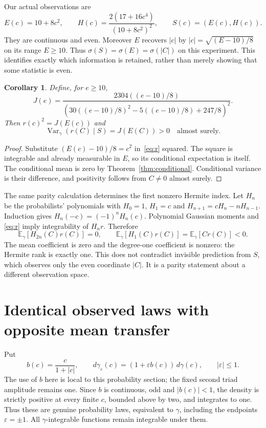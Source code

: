 \documentclass[11pt]{article}
\newtheorem{corollary}[theorem]{Corollary}
\newcommand{\E}{\mathbb E}\newcommand{\Var}{\operatorname{Var}}
\begin{document}
Our actual observations are
\begin{equation}\label{eq:S}
 E(c)=10+8c^2,\qquad
 H(c)=\frac{2(17+16c^4)}{(10+8c^2)^2},\qquad S(c)=(E(c),H(c)).
\end{equation}
They are continuous and even. Moreover $E$ recovers $|c|$ by
$|c|=\sqrt{(E-10)/8}$ on its range $E\geq10$. Thus
$\sigma(S)=\sigma(E)=\sigma(|C|)$ on this experiment.
This identifies exactly which information is retained, rather than
merely showing that some statistic is even.

\begin{corollary}\label{cor:variance}
Define, for $e\geq10$,
\[
 J(e)=\frac{2304((e-10)/8)}
       {\left(30((e-10)/8)^2-5((e-10)/8)+247/8\right)^2}.
\]
Then $r(c)^2=J(E(c))$ and
\[
 \Var_\gamma(r(C)\mid S)=J(E(C))>0
 \quad\text{almost surely}.
\]
\end{corollary}
\begin{proof}
Substitute $(E(c)-10)/8=c^2$ in~\eqref{eq:r} squared. The square
is integrable and already measurable in $E$, so its conditional
expectation is itself. The conditional mean is zero by
Theorem~\ref{thm:conditional}. Conditional variance is their difference,
and positivity follows from $C\ne0$ almost surely.
\end{proof}

The same parity calculation determines the first nonzero Hermite
index. Let $H_n$ be the probabilists' polynomials with
$H_0=1$, $H_1=c$ and $H_{n+1}=cH_n-nH_{n-1}$. Induction gives
$H_n(-c)=(-1)^nH_n(c)$. Polynomial Gaussian moments and
\eqref{eq:r} imply integrability of $H_nr$. Therefore
\[
 \E_\gamma[H_{2n}(C)r(C)]=0,\qquad
 \E_\gamma[H_1(C)r(C)]=\E_\gamma[Cr(C)]<0.
\]
The mean coefficient is zero and the degree-one coefficient is nonzero:
the Hermite rank is exactly one. This does not contradict invisible
prediction from $S$, which observes only the even coordinate $|C|$.
It is a parity statement about a different observation space.

\section{Identical observed laws with opposite mean transfer}
Put
\[
 b(c)=\frac{c}{1+|c|},\qquad
 d\gamma_\varepsilon(c)=(1+\varepsilon b(c))\,d\gamma(c),
 \qquad |\varepsilon|\leq1.
\]
The use of $b$ here is local to this probability section; the fixed
second triad amplitude remains one. Since $b$ is continuous, odd and
$|b(c)|<1$, the density is strictly positive at every finite $c$,
bounded above by two, and integrates to one. Thus these are genuine
probability laws, equivalent to $\gamma$, including the endpoints
$\varepsilon=\pm1$. All $\gamma$-integrable functions remain
integrable under them.
\end{document}
